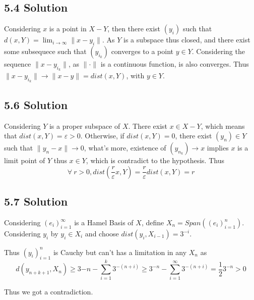 \documentclass{article}
\begin{document}
\subsection*{5.4 Solution}
Considering \(x\) is a point in \(X - Y\), then there exist \((y_i)\) such that \(d(x, Y) = \lim_{i \to \infty}\|x - y_i\|\). As \(Y\) is a subspace thus closed, and there exist some subsequece such that \((y_{i_k})\) converges to a point \(y \in Y\). Considering the sequence \(\|x - y_{i_k}\|\), as \(\|\cdot\|\) is a continuous function, is also converges. Thus \(\|x - y_{i_k}\| \to \|x - y\| = dist(x, Y)\), with \(y \in Y\).


\subsection*{5.6 Solution}
Considering \(Y\) is a proper subspace of \(X\). There exist \(x \in X - Y\), which means that \(dist(x, Y) = \varepsilon > 0\). Otherwise, if \(dist(x, Y) = 0\), there exist \((y_n) \in Y\) such that \(\|y_n - x\| \to 0\), what's more, existence of \((y_{n_k}) \to x\) implies \(x\) is a limit point of \(Y\) thus \(x \in Y\), which is contradict to the hypothesis. Thus 
\[\forall\ r > 0, dist(\frac{r}{\varepsilon}x, Y) = \frac{r}{\varepsilon}dist(x, Y) = r\]

\subsection*{5.7 Solution}
Considering \((e_i)_{i = 1}^\infty\) is a Hamel Basis of \(X\), define \(X_n = Span((e_i)_{i = 1}^n)\). Considering \(y_i\) by \(y_i \in X_i\) and choose \(dist(y_i, X_{i - 1}) = 3^{-i}\). 

Thus \((y_i)_{i = 1}^n\) is Cauchy but can't has a limitation in any \(X_n\) as 
\[d(y_{n + k + 1}, X_n) \ge 3{-n} - \sum_{i = 1}^k 3^{-(n + i)} \ge 3^{-n} - \sum_{i = 1}^\infty 3^{-(n + i)} = \frac{1}{2} 3^{-n} > 0\]

Thus we got a contradiction.
\end{document}
